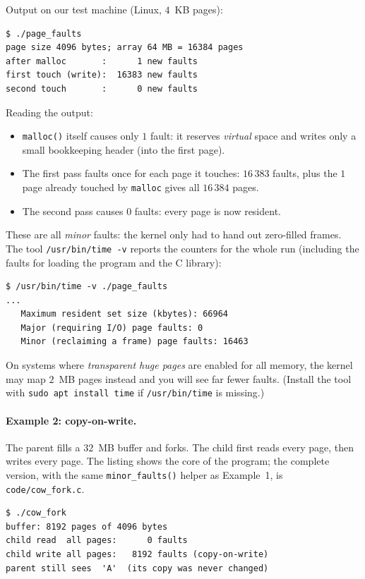 \documentclass[11pt,a4paper]{article}
\newcommand{\cmd}[1]{\texttt{#1}}
\begin{document}


Output on our test machine (Linux, $4$~KB pages):
\begin{lstlisting}[style=term]
$ ./page_faults
page size 4096 bytes; array 64 MB = 16384 pages
after malloc       :      1 new faults
first touch (write):  16383 new faults
second touch       :      0 new faults
\end{lstlisting}

Reading the output:
\begin{itemize}
  \item \cmd{malloc()} itself causes only $1$ fault: it reserves \emph{virtual} space and writes only a small bookkeeping header (into the first page).
  \item The first pass faults once for each page it touches: $16\,383$ faults, plus the $1$ page already touched by \cmd{malloc} gives all $16\,384$ pages.
  \item The second pass causes $0$ faults: every page is now resident.
\end{itemize}
These are all \emph{minor} faults: the kernel only had to hand out zero-filled frames. The tool \cmd{/usr/bin/time -v} reports the counters for the whole run (including the faults for loading the program and the C library):
\begin{lstlisting}[style=term]
$ /usr/bin/time -v ./page_faults
...
   Maximum resident set size (kbytes): 66964
   Major (requiring I/O) page faults: 0
   Minor (reclaiming a frame) page faults: 16463
\end{lstlisting}
On systems where \emph{transparent huge pages} are enabled for all memory, the kernel may map $2$~MB pages instead and you will see far fewer faults. (Install the tool with \cmd{sudo apt install time} if \cmd{/usr/bin/time} is missing.)

\paragraph{Example 2: copy-on-write.} The parent fills a $32$~MB buffer and forks. The child first reads every page, then writes every page. The listing shows the core of the program; the complete version, with the same \cmd{minor\_faults()} helper as Example~1, is \cmd{code/cow\_fork.c}.



\begin{lstlisting}[style=term]
$ ./cow_fork
buffer: 8192 pages of 4096 bytes
child read  all pages:      0 faults
child write all pages:   8192 faults (copy-on-write)
parent still sees  'A'  (its copy was never changed)
\end{lstlisting}
\end{document}
